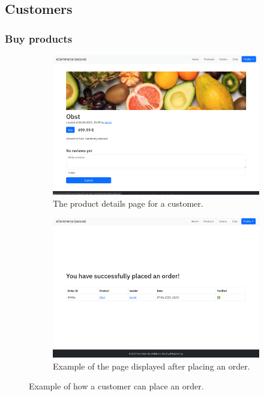 \documentclass[conference,onecolumn,a4paper]{IEEEtran}
\begin{document}
\subsection{Customers}

\subsubsection{Buy products}

\begin{figure}[H]
    \centering
    \begin{subfigure}[b]{0.4\linewidth}
        \includegraphics[width=\linewidth]{resources/product-customer.png}
        \caption{The product details page for a customer.}
    \end{subfigure}
    \begin{subfigure}[b]{0.4\linewidth}
        \includegraphics[width=\linewidth]{resources/order.png}
        \caption{Example of the page displayed after placing an order.}
    \end{subfigure}
    \caption{Example of how a customer can place an order.}
\end{figure}
\end{document}
